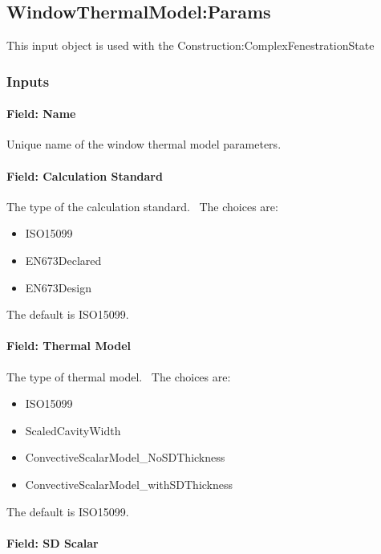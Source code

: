\subsection{WindowThermalModel:Params}\label{windowthermalmodelparams}

This input object is used with the Construction:ComplexFenestrationState

\subsubsection{Inputs}\label{inputs-40}

\paragraph{Field: Name}\label{field-name-33-000}

Unique name of the window thermal model parameters.

\paragraph{Field: Calculation Standard}\label{field-calculation-standard}

The type of the calculation standard.~ The choices are:

\begin{itemize}
\item
  ISO15099
\item
  EN673Declared
\item
  EN673Design
\end{itemize}

The default is ISO15099.

\paragraph{Field: Thermal Model}\label{field-thermal-model}

The type of thermal model.~ The choices are:

\begin{itemize}
\item
  ISO15099
\item
  ScaledCavityWidth
\item
  ConvectiveScalarModel\_NoSDThickness
\item
  ConvectiveScalarModel\_withSDThickness
\end{itemize}

The default is ISO15099.

\paragraph{Field: SD Scalar}\label{field-sd-scalar}

